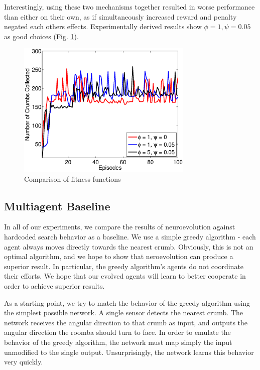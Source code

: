 \documentclass[conference]{IEEEtran}
\begin{document}
Interestingly, using these two mechanisms together resulted in worse performance than either on their own, as if simultaneously increased reward and penalty negated each others effects. 
Experimentally derived results show $\phi = 1, \psi = 0.05$ as good choices (Fig. \ref{neroevolution:fitness}). 

\begin{figure}[!t]
\centering
\includegraphics[width=3.3in]{./figures/neroevolution/reward.eps}
\caption{Comparison of fitness functions}
\label{neroevolution:fitness}
\end{figure}


\subsection{Multiagent Baseline}

In all of our experiments, we compare the results of neuroevolution against hardcoded search behavior as a baseline. We use a simple greedy algorithm - each agent always moves directly towards the nearest crumb. Obviously, this is not an optimal algorithm, and we hope to show that neroevolution can produce a superior result. In particular, the greedy algorithm's agents do not coordinate their efforts. We hope that our evolved agents will learn to better cooperate in order to achieve superior results.

As a starting point, we try to match the behavior of the greedy algorithm using the simplest possible network. A single sensor detects the nearest crumb. The network receives the angular direction to that crumb as input, and outputs the angular direction the roomba should turn to face. In order to emulate the behavior of the greedy algorithm, the network must map simply the input unmodified to the single output. Unsurprisingly, the network learns this behavior very quickly.
\end{document}
